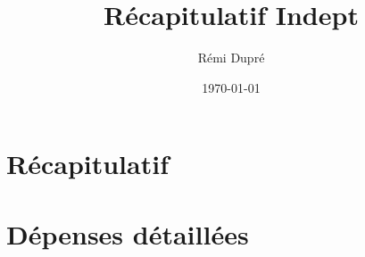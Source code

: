 \documentclass[french]{article}
\title{Récapitulatif Indept}
\author{Rémi Dupré}
\date\today
\begin{document}
    \maketitle
    
    \part*{Récapitulatif}
    
    \part*{Dépenses détaillées}
    
\end{document}
